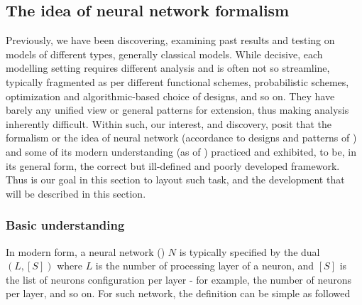 \subsection{The idea of neural network formalism}
Previously, we have been discovering, examining past results and testing on models of different types, generally classical models. While decisive, each modelling setting requires different analysis and is often not so streamline, typically fragmented as per different functional schemes, probabilistic schemes, optimization and algorithmic-based choice of designs, and so on. They have barely any unified view or general patterns for extension, thus making analysis inherently difficult. Within such, our interest, and discovery, posit that the formalism or the idea of neural network (accordance to designs and patterns of \cite{mcculloch_pitts_1943,hebb_1949,rosenblatt_1958,widrow_hoff_1960_adaline,minsky_papert_1969,fukushima_1980,kohonen_1982,hopfield_1982,werbos_1974,rumelhart_hinton_williams_1986,cybenko_1989,hornik_1991,hochreiter_schmidhuber_1997,lecun_bottou_bengio_haffner_1998,bishop_1995,haykin_1994}) and some of its modern understanding (as of \cite{goodfellow2016deep,zhang2023mathematical,hinton_osindero_teh_2006,lecun_bengio_hinton_2015,goodfellow_et_al_2014,srivastava_hinton_2014_dropout,szegedy_2014_inception,simonyan_zisserman_2014_vgg,vaswani_et_al_2017_transformer,he_zhang_ren_sun_2016_resnet,devlin_2018_bert,brown_et_al_2020_gpt3}) practiced and exhibited, to be, in its general form, the correct but ill-defined and poorly developed framework. Thus is our goal in this section to layout such task, and the development that will be described in this section. 

\subsubsection{Basic understanding}

In modern form, a neural network (\cite{goodfellow2016deep,zhang2023mathematical}) $N$ is typically specified by the dual $(L,[S])$ where $L$ is the number of processing layer of a neuron, and $[S]$ is the list of neurons configuration per layer - for example, the number of neurons per layer, and so on. For such network, the definition can be simple as followed 

